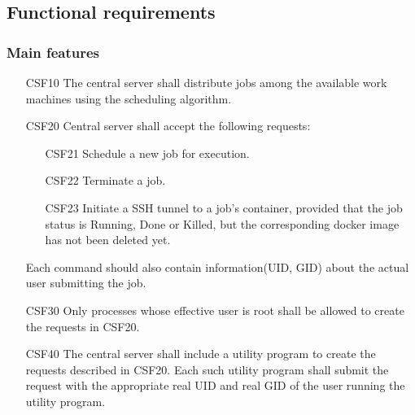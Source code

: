 \subsection{Functional requirements}
\subsubsection{Main features}
\begin{enumerate}
  \item[CSF10] The central server shall distribute \glspl{job}
    among the available work machines using the scheduling algorithm.
  \item[CSF20] Central server shall accept the following requests:
  \begin{enumerate}
    \item[CSF21] Schedule a new \gls{job} for execution.
    \item[CSF22] Terminate a \gls{job}.
    \item[CSF23] Initiate a SSH tunnel to a \gls{job}'s container, provided that the
      \gls{job status} is Running, Done or Killed, but the corresponding docker image
      has not been deleted yet.
  \end{enumerate}
    Each command should also contain information(\gls{UID}, \gls{GID}) about the actual user submitting the job.
  \item[CSF30] Only processes whose effective user is root shall be allowed to create the requests in CSF20.
  \item[CSF40] The central server shall include a utility program to create the requests described in CSF20.
    Each such utility program shall submit the request with the appropriate real \gls{UID} and real \gls{GID}
    of the user running the utility program.


\end{enumerate}
